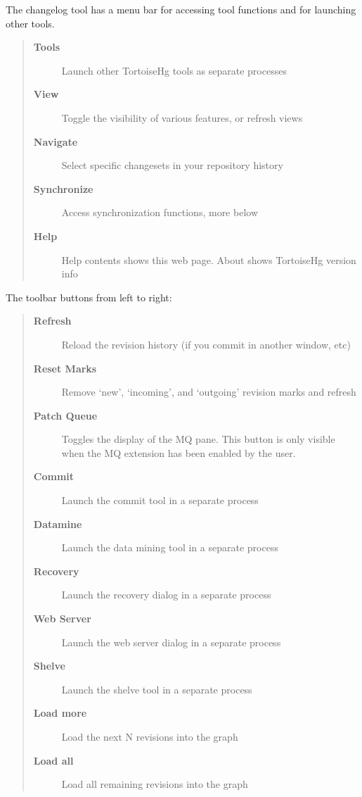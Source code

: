 \documentclass[letterpaper,10pt,english]{manual}
\begin{document}
The changelog tool has a menu bar for accessing tool functions and for
launching other tools.
\begin{quote}
\begin{description}
\item[\textbf{Tools}]
Launch other TortoiseHg tools as separate processes

\item[\textbf{View}]
Toggle the visibility of various features, or refresh views

\item[\textbf{Navigate}]
Select specific changesets in your repository history

\item[\textbf{Synchronize}]
Access synchronization functions, more below

\item[\textbf{Help}]
Help contents shows this web page.  About shows TortoiseHg
version info

\end{description}
\end{quote}

The toolbar buttons from left to right:
\begin{quote}
\begin{description}
\item[\textbf{Refresh}]
Reload the revision history (if you commit in another window, etc)

\item[\textbf{Reset Marks}]
Remove `new', `incoming', and `outgoing' revision marks and refresh

\item[\textbf{Patch Queue}]
Toggles the display of the MQ pane.  This button is only visible
when the MQ extension has been enabled by the user.

\item[\textbf{Commit}]
Launch the commit tool in a separate process

\item[\textbf{Datamine}]
Launch the data mining tool in a separate process

\item[\textbf{Recovery}]
Launch the recovery dialog in a separate process

\item[\textbf{Web Server}]
Launch the web server dialog in a separate process

\item[\textbf{Shelve}]
Launch the shelve tool in a separate process

\item[\textbf{Load more}]
Load the next N revisions into the graph

\item[\textbf{Load all}]
Load all remaining revisions into the graph

\end{description}
\end{quote}
\end{document}
